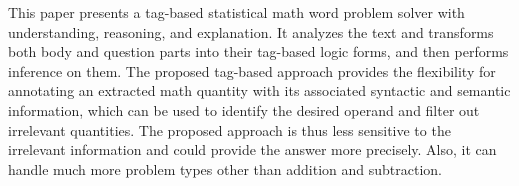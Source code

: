 This paper presents a tag-based statistical math word problem solver with understanding, reasoning, and explanation. It analyzes the text and transforms both body and question parts into their tag-based logic forms, and then performs inference on them. The proposed tag-based approach provides the flexibility for annotating an extracted math quantity with its associated syntactic and semantic information, which can be used to identify the desired operand and filter out irrelevant quantities. The proposed approach is thus less sensitive to the irrelevant information and could provide the answer more precisely. Also, it can handle much more problem types other than addition and subtraction.
